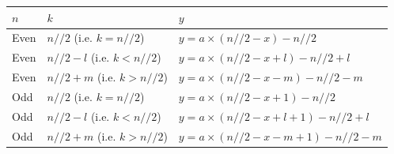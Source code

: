 \documentclass[10pt, twoside]{article}
\begin{document}
\begin{tabular}{|l ||l ||l|}
	\hline
	\textbf{$n$} & \textbf{$k$} & \textbf{$y$} \\
	\hline
	Even & $n//2$ \space(i.e. $k = n//2$) & $y = a \times (n//2-x) - n//2$ \\
	\hline
	Even & $n//2 - l$ \space(i.e. $k < n//2$) & $y = a \times (n//2-x+l ) - n//2 + l$ \\
	\hline
	Even & $n//2 + m $ (i.e. $k > n//2$) & $y = a \times (n//2-x-m ) - n//2 -m$ \\
	\hline
	Odd & $n//2 $ \space(i.e. $k = n//2$) & $y = a \times (n//2-x +1) - n//2$ \\
	\hline
	Odd & $n//2 - l $ \space(i.e. $k < n//2$) & $y = a \times (n//2-x+l +1) - n//2 + l$ \\
	\hline
	Odd & $n//2 + m $ (i.e. $k > n//2$)  & $y = a \times (n//2-x-m +1 ) - n//2 -m $ \\
	\hline
\end{tabular}
\end{document}
